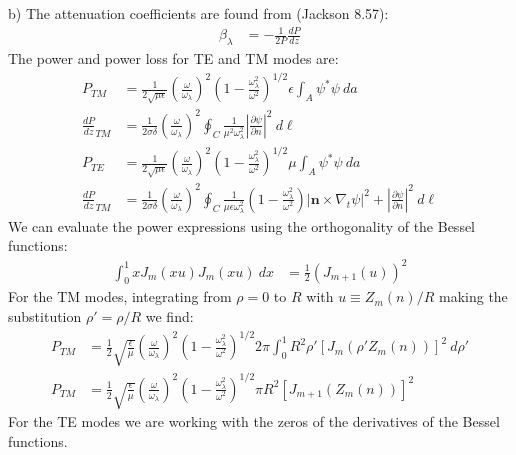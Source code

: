\documentclass[a4paper,11pt]{article}
\numberwithin{equation}{section}
\newcommand{\bv}[1]{\mathbf{#1}}
\newcommand{\lrp}[1]{\left({#1}\right)}
\begin{document}
\\ \\
b) The attenuation coefficients are found from (Jackson 8.57):
\begin{align}
 \beta_\lambda &= -\frac{1}{2P}\frac{dP}{dz}
\end{align}
The power and power loss for TE and TM modes are:
\begin{align}
 P_{TM} &= \frac{1}{2\sqrt{\mu\epsilon}}\lrp{\frac{\omega}{\omega_\lambda}}^2 \lrp{1-\frac{\omega_\lambda^2}{\omega^2}}^{1/2}\epsilon \int_A \psi^* \psi\ da\\
 \frac{dP}{dz}_{TM} &= \frac{1}{2\sigma\delta}\lrp{\frac{\omega}{\omega_\lambda}}^2\oint_C \frac{1}{\mu^2\omega_\lambda^2}|\frac{\partial \psi}{\partial n}|^2\ d\ell\\
 P_{TE} &= \frac{1}{2\sqrt{\mu\epsilon}}\lrp{\frac{\omega}{\omega_\lambda}}^2 \lrp{1-\frac{\omega_\lambda^2}{\omega^2}}^{1/2}\mu \int_A \psi^* \psi\ da\\
 \frac{dP}{dz}_{TM} &= \frac{1}{2\sigma\delta}\lrp{\frac{\omega}{\omega_\lambda}}^2
	      \oint_C \frac{1}{\mu\epsilon\omega_\lambda^2}\lrp{1-\frac{\omega_\lambda^2}{\omega^2}}|\bv{n}\times\nabla_t\psi|^2 
	      +|\frac{\partial \psi}{\partial n}|^2\ d\ell
\end{align}
We can evaluate the power expressions using the orthogonality of the Bessel functions:
\begin{align}
 \int_0^1 xJ_m(xu)J_m(xu)\ dx &= \frac{1}{2}\lrp{J_{m+1}(u)}^2
\end{align}
For the TM modes, integrating from $\rho=0$ to $R$ with $u \equiv Z_m(n)/R$ making the substitution $\rho' = \rho/R$ we find:
\begin{align}
 P_{TM} &= \frac{1}{2}\sqrt{\frac{\epsilon}{\mu}}\lrp{\frac{\omega}{\omega_\lambda}}^2\lrp{1-\frac{\omega_\lambda^2}{\omega^2}}^{1/2} 2\pi\int_0^1R^2\rho' \left[ J_m(\rho' Z_m(n))\right]^2\ d\rho'\\
 P_{TM} &= \frac{1}{2}\sqrt{\frac{\epsilon}{\mu}}\lrp{\frac{\omega}{\omega_\lambda}}^2\lrp{1-\frac{\omega_\lambda^2}{\omega^2}}^{1/2}\pi R^2\left[J_{m+1}(Z_m(n))\right]^2
\end{align}
For the TE modes we are working with the zeros of the derivatives of the Bessel functions. 
\end{document}

